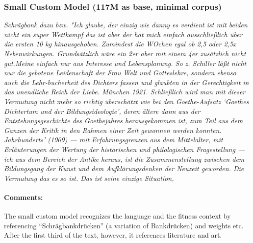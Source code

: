 \documentclass{scrartcl}
\begin{document}
\subsubsection{Small Custom Model (117M as base, minimal corpus)}
{\itshape
 Schrägbank dazu bzw.
"Ich glaube, der einzig wie danny es verdient ist mit beiden nicht ein super Wettkampf das ist aber der hat mich einfach ausschließlich über die ersten 10 kg hinausgehoben.
Zumindest die WOchen egal ob 2,5 oder 2,5x Nebenwirkungen.
Grundsätzlich wäre ein 2er aber mit einem 4er zusätzlich nicht gut.Meine einfach nur aus Interesse und Lebensplanung.
So z.
Schiller läßt nicht nur die gebotene Leidenschaft der Frau Welt und Gotteslehre, sondern ebenso auch die Lehr-bucherheit des Dichters fassen und glaubten in der Gerechtigkeit in das unendliche Reich der Liebe.
München 1921.
Schließlich wird man mit dieser Vermutung nicht mehr so richtig überschätzt wie bei den Goethe-Aufsatz ‘Goethes Dichtertum und der Bildungsideologie’, deren ältere dann aus der Entstehungsgeschichte des Goethejahres herausgekommen ist, zum Teil aus dem Ganzen der Kritik in den Rahmen einer Zeit gewonnen werden konnten.
Jahrhunderts’ (1909) — mit Erfahrungsgrenzen aus dem Mittelalter, mit Erläuterungen der Wertung der historischen und philologischen Fragestellung — ich aus dem Bereich der Antike heraus, ist die Zusammenstellung zwischen dem Bildungsgang der Kunst und dem Aufklärungsdenken der Neuzeit geworden.
Die Vermutung das es so ist.
Das ist seine einzige Situation,
}
\paragraph{Comments:}
The small custom model recognizes the language and the fitness context by referencing \enquote{Schrägbankdrücken} (a variation of Bankdrücken) and weights etc. After the first third of the text, however, it references literature and art.
\end{document}
